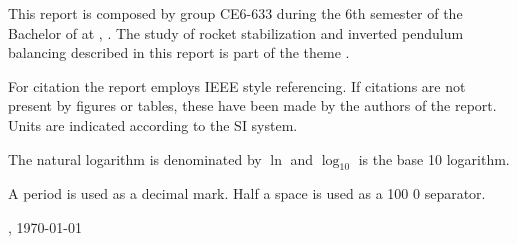 
This report is composed by group CE6-633 during the 6th semester of the Bachelor of \projectFaculty{} at \AAU{}, \the\year. The study of rocket stabilization and inverted pendulum balancing described in this report is part of the theme \textit{\projectTheme}. 

For citation the report employs IEEE style referencing. If citations are not present by figures or tables, these have been made by the authors of the report. Units are indicated according to the SI system.

The natural logarithm is denominated by $\ln$ and $\log_{10}$ is the base 10 logarithm.

A period is used as a decimal mark. Half a space is used as a 100 0 separator. 

\vspace{\baselineskip}\hfill \AAU, \today
\vfill\noindent

